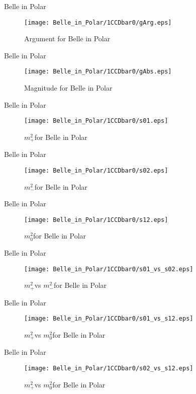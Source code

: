 \documentclass{beamer}
\newcommand{\MP}{\ensuremath{m^2_+}}
\newcommand{\MM}{\ensuremath{m^2_-}}
\newcommand{\MZ}{\ensuremath{m^2_0}}
\begin{document}
\begin{frame}{Belle in Polar}
\begin{figure}
\texttt{[image: Belle\_in\_Polar/1CCDbar0/gArg.eps]}
\caption{Argument for Belle in Polar}
\end{figure}
\end{frame}
\begin{frame}{Belle in Polar}
\begin{figure}
\texttt{[image: Belle\_in\_Polar/1CCDbar0/gAbs.eps]}
\caption{Magnitude for Belle in Polar}
\end{figure}
\end{frame}
\begin{frame}{Belle in Polar}
\begin{figure}
\texttt{[image: Belle\_in\_Polar/1CCDbar0/s01.eps]}
\caption{\MP for Belle in Polar}
\end{figure}
\end{frame}
\begin{frame}{Belle in Polar}
\begin{figure}
\texttt{[image: Belle\_in\_Polar/1CCDbar0/s02.eps]}
\caption{\MM for Belle in Polar}
\end{figure}
\end{frame}
\begin{frame}{Belle in Polar}
\begin{figure}
\texttt{[image: Belle\_in\_Polar/1CCDbar0/s12.eps]}
\caption{\MZ for Belle in Polar}
\end{figure}
\end{frame}
\begin{frame}{Belle in Polar}
\begin{figure}
\texttt{[image: Belle\_in\_Polar/1CCDbar0/s01\_vs\_s02.eps]}
\caption{\MP vs \MM for Belle in Polar}
\end{figure}
\end{frame}
\begin{frame}{Belle in Polar}
\begin{figure}
\texttt{[image: Belle\_in\_Polar/1CCDbar0/s01\_vs\_s12.eps]}
\caption{\MP vs \MZ for Belle in Polar}
\end{figure}
\end{frame}
\begin{frame}{Belle in Polar}
\begin{figure}
\texttt{[image: Belle\_in\_Polar/1CCDbar0/s02\_vs\_s12.eps]}
\caption{\MP vs \MZ for Belle in Polar}
\end{figure}
\end{frame}
\end{document}
